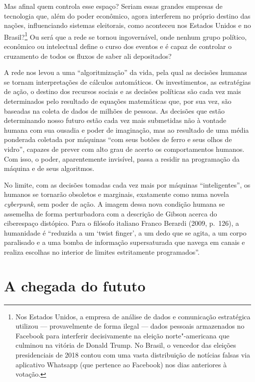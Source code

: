 Mas afinal quem controla esse espaço? Seriam essas grandes empresas de
tecnologia que, além do poder econômico, agora interferem no próprio
destino das nações, influenciando sistemas eleitorais, como aconteceu
nos Estados Unidos e no Brasil?\footnote{Nos Estados Unidos, a empresa
  de análise de dados e comunicação estratégica {}
  utilizou --- provavelmente de forma ilegal --- dados pessoais
  armazenados no Facebook para interferir decisivamente na eleição
  norte"-americana que culminou na vitória de Donald Trump. No Brasil, o
  vencedor das eleições presidenciais de 2018 contou com uma vasta
  distribuição de notícias falsas via aplicativo Whatsapp (que pertence
  ao Facebook) nos dias anteriores à votação.} Ou será que a rede se
tornou ingovernável, onde nenhum grupo político, econômico ou
intelectual define o curso dos eventos e é capaz de controlar o
cruzamento de todos os fluxos de saber ali depositados?

A rede nos levou a uma ``algoritmização'' da vida, pela qual as decisões
humanas se tornam interpretações de cálculos automáticos. Os
investimentos, as estratégias de ação, o destino dos recursos sociais e
as decisões políticas são cada vez mais determinados pelo resultado de
equações matemáticas que, por sua vez, são baseadas na coleta de dados
de milhões de pessoas. As decisões que estão determinando nosso futuro
estão cada vez mais submetidas não à vontade humana com sua ousadia e
poder de imaginação, mas ao resultado de uma média ponderada coletada
por máquinas ``com seus botões de ferro e seus olhos de vidro'', capazes
de prever com alto grau de acerto os comportamentos humanos. Com isso,
o poder, aparentemente invisível, passa a residir na programação da
máquina e de seus algoritmos.

No limite, com as decisões tomadas cada vez mais por máquinas
``inteligentes'', os humanos se tornarão obsoletos e marginais,
exatamente como numa novela \emph{cyberpunk}, sem poder de ação. A imagem dessa
nova condição humana se assemelha de forma perturbadora com a descrição
de Gibson acerca do ciberespaço distópico. Para o filósofo italiano
Franco Berardi (2009, p.~126), a humanidade é ``reduzida a um `twist
finger', a um dedo que se agita, a um corpo paralisado e a uma bomba de
informação supersaturada que navega em canais e realiza escolhas no
interior de limites estritamente programados''.

\chapter{A chegada do fututo}

